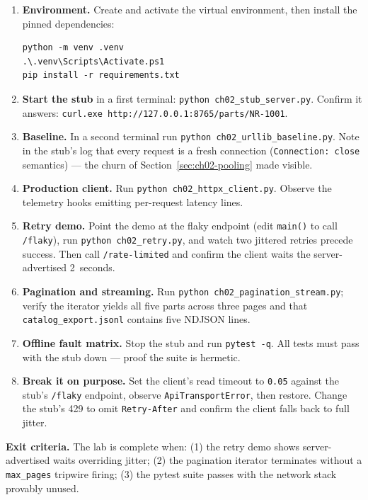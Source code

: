 \begin{enumerate}
  \item \textbf{Environment.} Create and activate the virtual environment,
        then install the pinned dependencies:
\begin{verbatim}
python -m venv .venv
.\.venv\Scripts\Activate.ps1
pip install -r requirements.txt
\end{verbatim}
  \item \textbf{Start the stub} in a first terminal:
        \texttt{python ch02\_stub\_server.py}. Confirm it answers:
        \texttt{curl.exe http://127.0.0.1:8765/parts/NR-1001}.
  \item \textbf{Baseline.} In a second terminal run
        \texttt{python ch02\_urllib\_baseline.py}. Note in the stub's log
        that every request is a fresh connection (\texttt{Connection: close}
        semantics) --- the churn of Section~\ref{sec:ch02-pooling} made
        visible.
  \item \textbf{Production client.} Run \texttt{python ch02\_httpx\_client.py}.
        Observe the telemetry hooks emitting per-request latency lines.
  \item \textbf{Retry demo.} Point the demo at the flaky endpoint (edit
        \texttt{main()} to call \texttt{/flaky}), run
        \texttt{python ch02\_retry.py}, and watch two jittered retries
        precede success. Then call \texttt{/rate-limited} and confirm the
        client waits the server-advertised 2~seconds.
  \item \textbf{Pagination and streaming.} Run
        \texttt{python ch02\_pagination\_stream.py}; verify the iterator
        yields all five parts across three pages and that
        \texttt{catalog\_export.jsonl} contains five NDJSON lines.
  \item \textbf{Offline fault matrix.} Stop the stub and run
        \texttt{pytest -q}. All tests must pass with the stub down --- proof
        the suite is hermetic.
  \item \textbf{Break it on purpose.} Set the client's read timeout to
        \texttt{0.05} against the stub's \texttt{/flaky} endpoint, observe
        \texttt{ApiTransportError}, then restore. Change the stub's 429 to
        omit \texttt{Retry-After} and confirm the client falls back to full
        jitter.
\end{enumerate}

\begin{keyconceptbox}
\textbf{Exit criteria.} The lab is complete when: (1) the retry demo shows
server-advertised waits overriding jitter; (2) the pagination iterator
terminates without a \texttt{max\_pages} tripwire firing; (3) the pytest suite
passes with the network stack provably unused.
\end{keyconceptbox}

